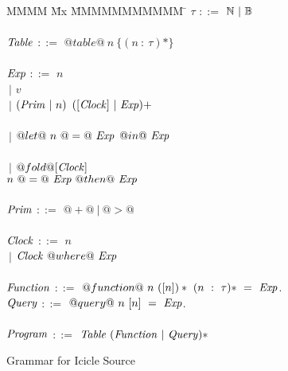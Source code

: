 
\begin{figure}

\begin{tabbing}
MMMM \= Mx \= MMMMMMMMMMM \= \kill
$\tau$          \> $::=$  \> $\mathbb{N}~|~\mathbb{B}$ \\
\\
$\mathit{Table}$    \> $::=$  \> $@table@~n~\{(n~:~\tau)*\}$ \\
\\
$\mathit{Exp}$
    \> $::=$  \> $n$          \\
    \> $~|$ \> $v$     \\
    \> $~|$ \> $(\mathit{Prim}~|~n)$     \> $([\mathit{Clock}]~|~\mathit{Exp})+$ \\
\\
    \> $~|$ \> $@let@~n~@=@~\mathit{Exp}$
            \> $@in@~\mathit{Exp}$ \\
                \\
    \> $~|$ \> $@fold@[\mathit{Clock}]$ \\
    \>      \> $n~@=@~\mathit{Exp}~@then@~\mathit{Exp}$
\\
\\
$\mathit{Prim}$
    \> $::=$  \> $@+@~|~@>@$ \\
\\
$\mathit{Clock}$
    \> $::=$  \> $n$          \\
    \> $~|$ \> $\mathit{Clock}~@where@~\mathit{Exp}$          \\
\\
$\mathit{Function}$
    \> $::=$  \> $@function@~n~([n])*~(n~:~\tau)*~=~\mathit{Exp}$.          \\

$\mathit{Query}$
    \> $::=$  \> $@query@~n~[n]~=~\mathit{Exp}$.          \\
\\
$\mathit{Program}$
    \> $::=$  \> $\mathit{Table}~(\mathit{Function}~|~\mathit{Query})*$ \\
\end{tabbing}


\caption{Grammar for Icicle Source}
\label{fig:source:grammar}
\end{figure}

